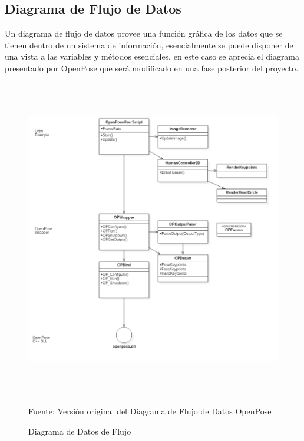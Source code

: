 \clearpage
\subsection{Diagrama de Flujo de Datos}

Un diagrama de flujo de datos provee una función gráfica de los datos que se tienen dentro de un sistema de información, esencialmente se puede disponer de una vista a las variables y métodos esenciales, en este caso se aprecia el diagrama presentado por OpenPose que será modificado en una fase posterior del proyecto.

\begin{figure}[h]
\centering
\includegraphics[width=14cm,height=14cm,]{./Images/futurediagramaderequisitos.png}
\caption{Diagrama de Datos de Flujo}
\footnotesize Fuente: Versión original del Diagrama de Flujo de Datos OpenPose \cite{8765346}
\label{dfd}
\end{figure}



